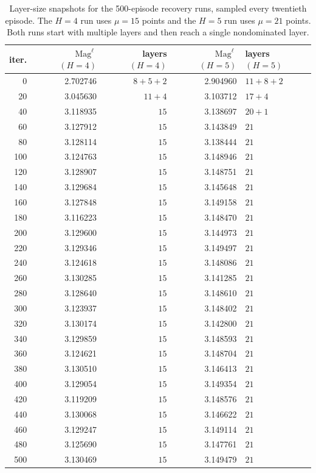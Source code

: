 \documentclass{article}
\newcommand{\Mag}{\operatorname{Mag}}
\begin{document}
\begin{table}[htbp]
\centering
\small
\setlength{\tabcolsep}{4pt}
\begin{tabular}{rrrrl}
\hline
iter. & $\Mag^\ell$ $(H=4)$ & layers $(H=4)$ & $\Mag^\ell$ $(H=5)$ & layers $(H=5)$ \\
\hline
0 & 2.702746 & $8+5+2$ & 2.904960 & $11+8+2$ \\
20 & 3.045630 & $11+4$ & 3.103712 & $17+4$ \\
40 & 3.118935 & $15$ & 3.138697 & $20+1$ \\
60 & 3.127912 & $15$ & 3.143849 & $21$ \\
80 & 3.128114 & $15$ & 3.138444 & $21$ \\
100 & 3.124763 & $15$ & 3.148946 & $21$ \\
120 & 3.128907 & $15$ & 3.148751 & $21$ \\
140 & 3.129684 & $15$ & 3.145648 & $21$ \\
160 & 3.127848 & $15$ & 3.149158 & $21$ \\
180 & 3.116223 & $15$ & 3.148470 & $21$ \\
200 & 3.129600 & $15$ & 3.144973 & $21$ \\
220 & 3.129346 & $15$ & 3.149497 & $21$ \\
240 & 3.124618 & $15$ & 3.148086 & $21$ \\
260 & 3.130285 & $15$ & 3.141285 & $21$ \\
280 & 3.128640 & $15$ & 3.148610 & $21$ \\
300 & 3.123937 & $15$ & 3.148402 & $21$ \\
320 & 3.130174 & $15$ & 3.142800 & $21$ \\
340 & 3.129859 & $15$ & 3.148593 & $21$ \\
360 & 3.124621 & $15$ & 3.148704 & $21$ \\
380 & 3.130510 & $15$ & 3.146413 & $21$ \\
400 & 3.129054 & $15$ & 3.149354 & $21$ \\
420 & 3.119209 & $15$ & 3.148576 & $21$ \\
440 & 3.130068 & $15$ & 3.146622 & $21$ \\
460 & 3.129247 & $15$ & 3.149114 & $21$ \\
480 & 3.125690 & $15$ & 3.147761 & $21$ \\
500 & 3.130469 & $15$ & 3.149479 & $21$ \\
\hline
\end{tabular}
\caption{Layer-size snapshots for the 500-episode recovery runs, sampled every twentieth episode.  The $H=4$ run uses $\mu=15$ points and the $H=5$ run uses $\mu=21$ points.  Both runs start with multiple layers and then reach a single nondominated layer.}
\label{tab:convergence-recovery-layer-snapshots}
\end{table}
\end{document}
